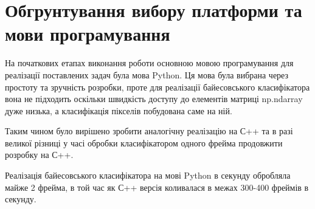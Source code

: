 \section{Обгрунтування вибору платформи та мови програмування}

На початкових етапах виконання роботи основною мовою програмування для реалізації поставлених задач була мова Python. Ця мова була вибрана через простоту та зручність розробки, проте для реалізації байесовського класифікатора вона не підходить оскільки швидкість доступу до елементів матриці np.ndarray дуже низька, а класифікація пікселів побудована саме на ній.

Таким чином було вирішено зробити аналогічну реалізацію на С++ та в разі великої різниці у часі обробки класифікатором одного фрейма продовжити розробку на С++. 

Реалізація байесовського класифікатора на мові Python в секунду обробляла майже 2 фрейма, в той час як С++ версія коливалася в межах 300-400 фреймів в секунду.

